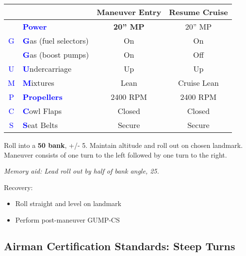 \begin{table}[H]
\centering
\begin{tabular}{|c|l|c|c|}
\hline
                    &                                                 & \textbf{Maneuver Entry} & \textbf{Resume Cruise} \\ \hline
                    & \textcolor{blue}{\textbf{Power}}                & \textbf{20'' MP}        & 20'' MP                \\ \hline
\textcolor{blue}{G} & \textcolor{blue}{\textbf{G}}as (fuel selectors) & On                      & On                     \\
                    & \textcolor{blue}{\textbf{G}}as (boost pumps)    & On                      & Off                    \\ \hline
\textcolor{blue}{U} & \textcolor{blue}{\textbf{U}}ndercarriage        & Up                      & Up                     \\ \hline
\textcolor{blue}{M} & \textcolor{blue}{\textbf{M}}ixtures             & Lean                    & Cruise Lean            \\ \hline
\textcolor{blue}{P} & \textcolor{blue}{\textbf{Propellers}}           & 2400 RPM                & 2400 RPM               \\ \hline
\textcolor{blue}{C} & \textcolor{blue}{\textbf{C}}owl Flaps           & Closed                  & Closed                 \\ \hline
\textcolor{blue}{S} & \textcolor{blue}{\textbf{S}}eat Belts           & Secure                  & Secure                 \\ \hline
\end{tabular}
\end{table}

Roll into a \textbf{50\degree{} bank}, +/- 5\degree{}. Maintain altitude and roll out on chosen landmark.
Maneuver consists of one turn to the left followed by one turn to the right.

\emph{Memory aid: Lead roll out by half of bank angle, 25\degree{}.}

Recovery:
\begin{itemize}[label={}]
\item Roll straight and level on landmark
\item Perform post-maneuver GUMP-CS
\end{itemize}

\newpage 

\subsection{Airman Certification Standards: Steep Turns}

